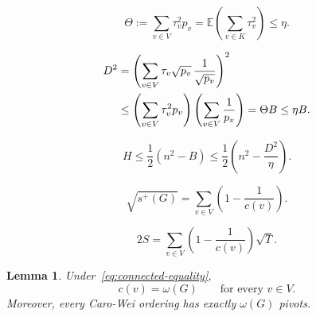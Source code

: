 \documentclass[10pt,a4paper]{amsart}
\newtheorem{lemma}{Lemma}
\newcommand{\E}{\mathbb E}
\newcommand{\splus}{s^{+}}
\begin{document}
		\begin{equation}\label{eq:Theta-bound}
			\Theta
			:=
			\sum_{v\in V}\tau_v^2p_v
			=
			\E\left(\sum_{v\in K}\tau_v^2\right)
			\leq\eta.
		\end{equation}

		\begin{align}
			D^2
			&=
			\left(
			\sum_{v\in V}
			\tau_v\sqrt{p_v}\,\frac1{\sqrt{p_v}}
			\right)^2 \notag\\
			&\leq
			\left(\sum_{v\in V}\tau_v^2p_v\right)
			\left(\sum_{v\in V}\frac1{p_v}\right)
			=\Theta B
			\leq\eta B.
			\label{eq:D-square}
		\end{align}

		\begin{equation}\label{eq:H-upper}
			H
			\leq
			\frac12\left(n^2-B\right)
			\leq
			\frac12\left(n^2-\frac{D^2}{\eta}\right).
		\end{equation}

	\begin{equation}\label{eq:connected-equality}
		\sqrt{\splus(G)}=\sum_{v\in V}\left(1-\frac1{c(v)}\right).
	\end{equation}

	\begin{equation}\label{eq:DNN-equality-special}
		2S=\sum_{v\in V}\left(1-\frac1{c(v)}\right)\sqrt{T}.
	\end{equation}

	\begin{lemma}
		
		\label{lem:local-clique-rigidity}
		Under~\eqref{eq:connected-equality},
		\[
		c(v)=\omega(G)
		\qquad\text{for every }v\in V.
		\]
		Moreover, every Caro-Wei ordering has exactly $\omega(G)$ pivots.
	\end{lemma}
\end{document}
